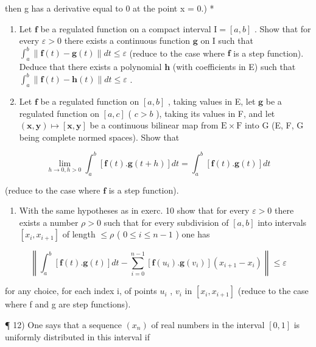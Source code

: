 then g has a derivative equal to 0 at the point x = 0.) *

\begin{enumerate}
\def\labelenumi{\arabic{enumi})}
\setcounter{enumi}{8}
\item
  Let \(\mathbf{f}\) be a regulated function on a compact interval \(\mathrm{I} = [a, b]\) . Show that for every \(\varepsilon > 0\) there exists a continuous function \(\mathbf{g}\) on \(\mathrm{I}\) such that \(\int_{a}^{b} \| \mathbf{f}(t) - \mathbf{g}(t) \| dt \leqslant \varepsilon\) (reduce to the case where \(\mathbf{f}\) is a step function). Deduce that there exists a polynomial \(\mathbf{h}\) (with coefficients in E) such that \(\int_{a}^{b} \| \mathbf{f}(t) - \mathbf{h}(t) \| dt \leqslant \varepsilon\) .
\item
  Let \(\mathbf{f}\) be a regulated function on \([a, b]\) , taking values in E, let \(\mathbf{g}\) be a regulated function on \([a, c]\) ( \(c > b\) ), taking its values in F, and let \((\mathbf{x}, \mathbf{y}) \mapsto [\mathbf{x}, \mathbf{y}]\) be a continuous bilinear map from \(\mathrm{E} \times \mathrm{F}\) into G (E, F, G being complete normed spaces). Show that
\end{enumerate}

\[
\lim _ {h \rightarrow 0, h > 0} \int_ {a} ^ {b} [ \mathbf {f} (t). \mathbf {g} (t + h) ] d t = \int_ {a} ^ {b} [ \mathbf {f} (t). \mathbf {g} (t) ] d t
\]

(reduce to the case where \(\mathbf{f}\) is a step function).

\begin{enumerate}
\def\labelenumi{\arabic{enumi})}
\setcounter{enumi}{10}
\tightlist
\item
  With the same hypotheses as in exerc. 10 show that for every \(\varepsilon > 0\) there exists a number \(\rho > 0\) such that for every subdivision of \([a, b]\) into intervals \([x_i, x_{i+1}]\) of length \(\leqslant \rho\) ( \(0 \leqslant i \leqslant n-1\) ) one has
\end{enumerate}

\[
\left\| \int_ {a} ^ {b} [ \mathbf {f} (t). \mathbf {g} (t) ] d t - \sum_ {i = 0} ^ {n - 1} [ \mathbf {f} (u _ {i}). \mathbf {g} (v _ {i}) ] (x _ {i + 1} - x _ {i}) \right\| \leqslant \varepsilon
\]

for any choice, for each index i, of points \(u_{i}\) , \(v_{i}\) in \([x_{i}, x_{i+1}]\) (reduce to the case where f and g are step functions).

¶ 12) One says that a sequence \((x_{n})\) of real numbers in the interval \([0, 1]\) is uniformly distributed in this interval if


